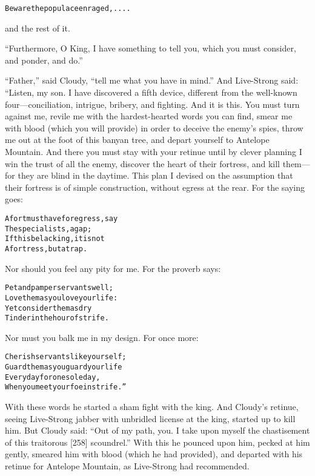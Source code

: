 \documentclass{article}
\renewenvironment{verbatim}{\begin{alltt}\normalfont\begin{centering}}{\end{centering}\end{alltt}}
\begin{document}
\begin{verbatim}
Beware the populace enraged, ....
\end{verbatim}
and the rest of it.

``Furthermore, O King, I have something to tell you, which you must consider, and ponder, and do.''

``Father,'' said Cloudy, ``tell me what you have in mind.'' And
Live-Strong said: “Listen, my son. I have discovered a fifth
device, different from the well-known four---conciliation,
intrigue, bribery, and fighting. And it is this. You must turn
against me, revile me with the hardest-hearted words you can find,
smear me with blood (which you will provide) in order to deceive
the enemy's spies, throw me out at the foot of this banyan tree,
and depart yourself to Antelope Mountain. And there you must stay
with your retinue until by clever planning I win the trust of all
the enemy, discover the heart of their fortress, and kill
them---for they are blind in the daytime. This plan I devised on
the assumption that their fortress is of simple construction,
without egress at the rear. For the saying goes:

\begin{verbatim}
A fort must have for egress, say
    The specialists, a gap;
If this be lacking, it is not
    A fortress, but a trap.
\end{verbatim}
Nor should you feel any pity for me. For the proverb says:

\begin{verbatim}
Pet and pamper servants well;
    Love them as you love your life:
Yet consider them as dry
    Tinder in the hour of strife.
\end{verbatim}
Nor must you balk me in my design. For once more:

\begin{verbatim}
Cherish servants like yourself;
    Guard them as you guard your life
Every day for one sole day,
    When you meet your foe in strife.”
\end{verbatim}
With these words he started a sham fight with the king. And
Cloudy's retinue, seeing Live-Strong jabber with unbridled license
at the king, started up to kill him. But Cloudy said:
``Out of my path, you. I take upon myself the chastisement of this traitorous [258] scoundrel.''
With this he pounced upon him, pecked at him gently, smeared him
with blood (which he had provided), and departed with his retinue
for Antelope Mountain, as Live-Strong had recommended.
\end{document}
